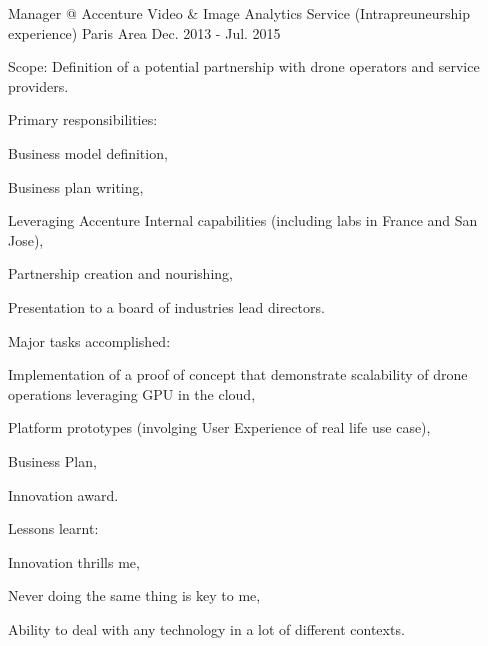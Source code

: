 

\begin{cventries}

  \cventry
    {Manager @ Accenture} %
    {Video \& Image Analytics Service (Intrapreuneurship experience)} %
    {Paris Area} %
    {Dec. 2013 - Jul. 2015} %
    {
      \begin{cvitems} %
        \item {Scope: Definition of a potential partnership with drone operators and service providers.}
        \item {Primary responsibilities:}
        \begin{cvsubitems}
          \item {Business model definition,}
          \item {Business plan writing,}
          \item {Leveraging Accenture Internal capabilities (including labs in France and San Jose),}
          \item {Partnership creation and nourishing,}
          \item {Presentation to a board of industries lead directors.}
        \end{cvsubitems}
        \item {Major tasks accomplished:}
        \begin{cvsubitems}
          \item {Implementation of a proof of concept that demonstrate scalability of drone operations leveraging GPU in the cloud,}
          \item {Platform prototypes (involging User Experience of real life use case),}
          \item {Business Plan,}
          \item {Innovation award.}
        \end{cvsubitems}
        \item {Lessons learnt:}
        \begin{cvsubitems}
          \item {Innovation thrills me,}
          \item {Never doing the same thing is key to me,}
          \item {Ability to deal with any technology in a lot of different contexts.}
        \end{cvsubitems}
      \end{cvitems}
    }


\end{cventries}
